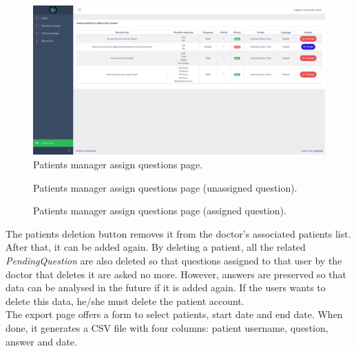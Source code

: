 \documentclass[12pt,english]{article}
\begin{document}
\begin{figure}[H]
  \centering
    \includegraphics[width=\textwidth]{assign_questions.png}
  \caption{Patients manager assign questions page.}
\end{figure}

\begin{figure}[H]
    \caption{Patients manager assign questions page (unassigned question).}
\end{figure}

\begin{figure}[H]
    \caption{Patients manager assign questions page (assigned question).}
\end{figure}

The patients deletion button removes it from the doctor's associated patients list. After that, it can be added again. By deleting a patient, all the related \emph{PendingQuestion} are also deleted so that questions assigned to that user by the doctor that deletes it are asked no more. However, answers are preserved so that data can be analysed in the future if it is added again. If the users wants to delete this data, he/she must delete the patient account.
\\


The export page offers a form to select patients, start date and end date. When done, it generates a CSV file with four columns: patient username, question, answer and date.
\end{document}
